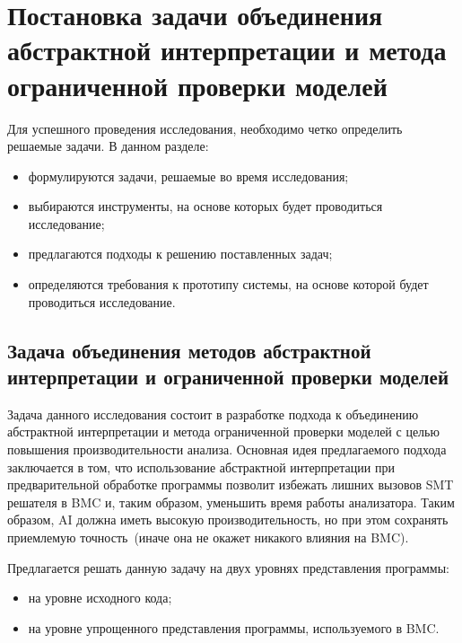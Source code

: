 \chapter{Постановка задачи объединения абстрактной интерпретации и метода 
ограниченной проверки моделей}
Для успешного проведения исследования, необходимо четко определить решаемые 
задачи. В данном разделе:
\begin{itemize}
\item формулируются задачи, решаемые во время исследования;
\item выбираются инструменты, на основе которых будет проводиться исследование;
\item предлагаются подходы к решению поставленных задач;
\item определяются требования к прототипу системы, на основе которой будет 
проводиться исследование.
\end{itemize}

\section{Задача объединения методов абстрактной интерпретации и ограниченной 
проверки моделей}
Задача данного исследования состоит в разработке подхода к объединению 
абстрактной интерпретации и метода ограниченной проверки моделей с целью 
повышения производительности анализа. Основная идея предлагаемого подхода 
заключается в том, что использование абстрактной интерпретации при предварительной
обработке программы позволит избежать лишних вызовов SMT решателя в BMC и,
таким образом, уменьшить время работы анализатора. Таким образом, AI должна
иметь высокую производительность, но при этом сохранять приемлемую 
точность~(иначе она не окажет никакого влияния на BMC).

Предлагается решать данную задачу на двух уровнях представления программы:
\begin{itemize}
\item на уровне исходного кода;
\item на уровне упрощенного представления программы, используемого в BMC.
\end{itemize}

